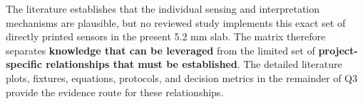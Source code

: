 \clearpage
{}

{\fontsize{9.25}{10.95}\selectfont
The literature establishes that the individual sensing and interpretation
mechanisms are plausible, but no reviewed study implements this exact set of
directly printed sensors in the present 5.2 mm slab. The matrix therefore
separates \textbf{knowledge that can be leveraged} from the limited set of
\textbf{project-specific relationships that must be established}. The detailed
literature plots, fixtures, equations, protocols, and decision metrics in the
remainder of Q3 provide the evidence route for these relationships.\par}

\vspace{0.4em}
\begingroup
\fontsize{7.55}{8.9}\selectfont
\setlength{\tabcolsep}{2.35pt}
\renewcommand{\arraystretch}{1.1}

